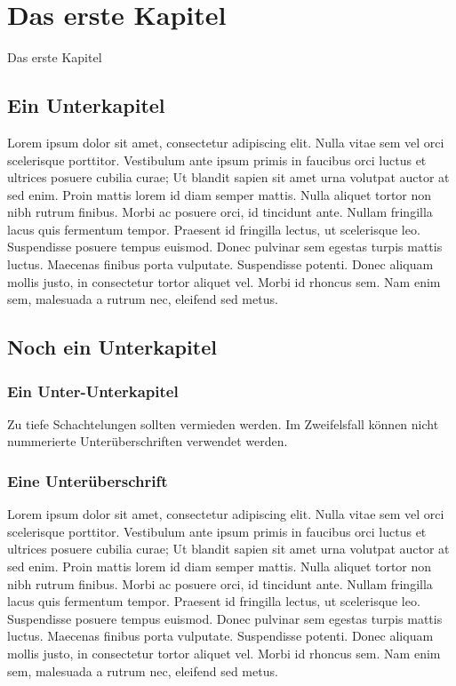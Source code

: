 \chapter{Das erste Kapitel}

Das erste Kapitel

\section{Ein Unterkapitel}

Lorem ipsum dolor sit amet, consectetur adipiscing elit. Nulla vitae sem vel orci scelerisque porttitor. Vestibulum ante ipsum primis in faucibus orci luctus et ultrices posuere cubilia curae; Ut blandit sapien sit amet urna volutpat auctor at sed enim. Proin mattis lorem id diam semper mattis. Nulla aliquet tortor non nibh rutrum finibus. Morbi ac posuere orci, id tincidunt ante. Nullam fringilla lacus quis fermentum tempor. Praesent id fringilla lectus, ut scelerisque leo. Suspendisse posuere tempus euismod. Donec pulvinar sem egestas turpis mattis luctus. Maecenas finibus porta vulputate. Suspendisse potenti. Donec aliquam mollis justo, in consectetur tortor aliquet vel. Morbi id rhoncus sem. Nam enim sem, malesuada a rutrum nec, eleifend sed metus.



\section{Noch ein  Unterkapitel}

\subsection{Ein  Unter-Unterkapitel}


Zu tiefe Schachtelungen sollten vermieden werden. Im Zweifelsfall k\"onnen nicht nummerierte Unter\"uberschriften verwendet werden.

\subsection*{Eine Unter\"uberschrift}

Lorem ipsum dolor sit amet, consectetur adipiscing elit. Nulla vitae sem vel orci scelerisque porttitor. Vestibulum ante ipsum primis in faucibus orci luctus et ultrices posuere cubilia curae; Ut blandit sapien sit amet urna volutpat auctor at sed enim. Proin mattis lorem id diam semper mattis. Nulla aliquet tortor non nibh rutrum finibus. Morbi ac posuere orci, id tincidunt ante. Nullam fringilla lacus quis fermentum tempor. Praesent id fringilla lectus, ut scelerisque leo. Suspendisse posuere tempus euismod. Donec pulvinar sem egestas turpis mattis luctus. Maecenas finibus porta vulputate. Suspendisse potenti. Donec aliquam mollis justo, in consectetur tortor aliquet vel. Morbi id rhoncus sem. Nam enim sem, malesuada a rutrum nec, eleifend sed metus.



